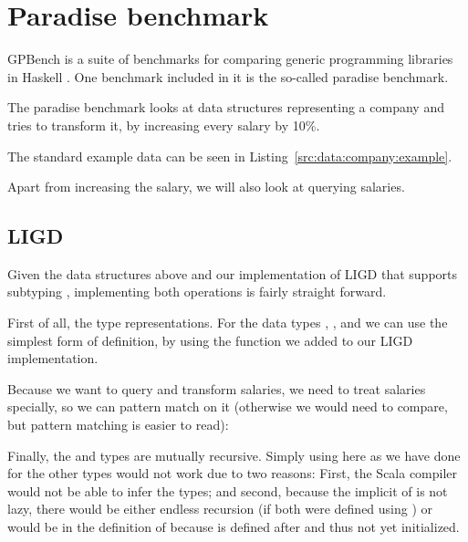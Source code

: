 \section{Paradise benchmark}
GPBench is a suite of benchmarks for comparing generic programming
libraries in Haskell \cite{DBLP:conf/haskell/RodriguezJJGKO08}. One
benchmark included in it is the so-called paradise benchmark.

The paradise benchmark looks at data structures representing a company
and tries to transform it, by increasing every salary by 10\%.{}



The standard example data can be seen in Listing~\ref{src:data:company:example}.



Apart from increasing the salary, we will also look at querying salaries.


\subsection{LIGD}

Given the data structures above and our implementation of LIGD that supports
subtyping , implementing both operations is fairly straight forward.

First of all, the type representations. For the data types ,
, and we can use the simplest form of definition,
by using the  function we added to our LIGD implementation.




Because we want to query and transform salaries, we need to treat salaries
specially, so we can pattern match on it (otherwise we would need to compare,
but pattern matching is easier to read):



Finally, the  and  types are mutually recursive. Simply
using  here as we have done for the other types would not work due
to two reasons: First, the Scala compiler would not be able to infer the types;
and second, because the implicit  of  is not lazy, there would
be either endless recursion (if both were defined using ) or 
would be  in the definition of  because  is defined
after  and thus not yet initialized.

